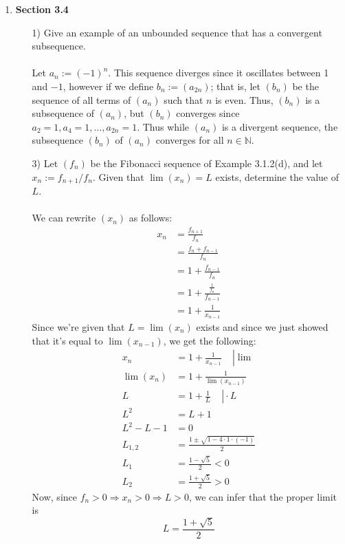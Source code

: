 \documentclass[12pt,letterpaper]{article}
\newcommand{\N}{\mathbb{N}}
\theoremstyle{case}
\theoremstyle{definition}
\begin{document}
\begin{enumerate}
	\item \textbf{Section 3.4}
	\begin{enumerate}
		\item[1)] Give an example of an unbounded sequence that has a convergent subsequence.
		\\\\Let $a_n:=(-1)^n$. This sequence diverges since it oscillates between 1 and $-1$, however if we define $b_n:=(a_{2n})$; that is, let $(b_n)$ be the sequence of all terms of $(a_n)$ such that $n$ is even. Thus, $(b_n)$ is a subsequence of $(a_n)$, but $(b_n)$ converges since $a_2=1, a_4=1, \dots, a_{2n}=1$. Thus while $(a_n)$ is a divergent sequence, the subsequence $(b_n)$ of $(a_n)$ converges for all $n \in \N$.\\
		
		\item[3)] Let $(f_n)$ be the Fibonacci sequence of Example 3.1.2(d), and let $x_n := f_{n+1}/f_n$. Given that $\lim (x_n) =L$ exists, determine the value of $L$.
		\\\\We can rewrite $(x_n)$ as follows:
		\begin{align*}
			x_n &= \frac{f_{n+1}}{f_n} \\
			&=\frac{f_n+f_{n-1}}{f_n} \\
			&= 1+\frac{f_{n-1}}{f_n} \\
			&= 1+\frac{\frac{1}{f_n}}{f_{n-1}} \\
			&= 1+\frac{1}{x_{n-1}}
		\end{align*}
		Since we're given that $L=\lim (x_n)$ exists and since we just showed that it's equal to $\lim (x_{n-1})$, we get the following:
		\begin{align*}
			x_n &= \left. 1+\frac{1}{x_{n-1}}\ \ \ \ \ \right| \lim \\
			\lim (x_n) &= 1+\frac{1}{\lim(x_{n-1})} \\
			L &= \left. 1+\frac{1}{L}\ \ \ \ \ \right| \cdot L \\
			L^2 &= L + 1 \\
			L^2-L-1 &= 0 \\
			L_{1,2} &= \frac{1 \pm \sqrt{1-4 \cdot 1 \cdot (-1)}}{2} \\
			L_1 &= \frac{1-\sqrt{5}}{2} <0 \\
			L_2 &= \frac{1+\sqrt{5}}{2}>0
		\end{align*}
		Now, since $f_n >0 \Rightarrow x_n >0 \Rightarrow L>0$, we can infer that the proper limit is
		\[L=\frac{1+\sqrt{5}}{2}\]
		\\
		

\end{enumerate}
\end{enumerate}
\end{document}

